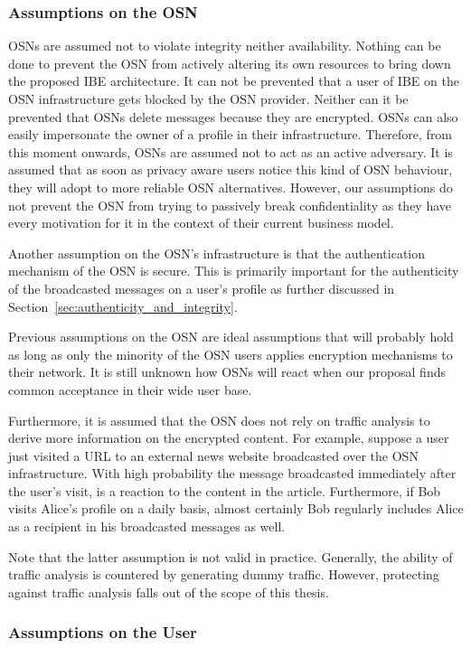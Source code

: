 \subsubsection{Assumptions on the OSN}
OSNs are assumed not to violate integrity neither availability. Nothing can be done to prevent the OSN from actively altering its own resources to bring down the proposed IBE architecture. It can not be prevented that a user of IBE on the OSN infrastructure gets blocked by the OSN provider. Neither can it be prevented that OSNs delete messages because they are encrypted. OSNs can also easily impersonate the owner of a profile in their infrastructure. Therefore, from this moment onwards, OSNs are assumed not to act as an active adversary. It is assumed that as soon as privacy aware users notice this kind of OSN behaviour, they will adopt to more reliable OSN alternatives. However, our assumptions do not prevent the OSN from trying to passively break confidentiality as they have every motivation for it in the context of their current business model.

Another assumption on the OSN's infrastructure is that the authentication mechanism of the OSN is secure. This is primarily important for the authenticity of the broadcasted messages on a user's profile as further discussed in Section~\ref{sec:authenticity_and_integrity}.

Previous assumptions on the OSN are ideal assumptions that will probably hold as long as only the minority of the OSN users applies encryption mechanisms to their network. It is still unknown how OSNs will react when our proposal finds common acceptance in their wide user base.

Furthermore, it is assumed that the OSN does not rely on traffic analysis to derive more information on the encrypted content. For example, suppose a user just visited a URL to an external news website broadcasted over the OSN infrastructure. With high probability the message broadcasted immediately after the user's visit, is a reaction to the content in the article. Furthermore, if Bob visits Alice's profile on a daily basis, almost certainly Bob regularly includes Alice as a recipient in his broadcasted messages as well.

Note that the latter assumption is not valid in practice. Generally, the ability of traffic analysis is countered by generating dummy traffic. However, protecting against traffic analysis falls out of the scope of this thesis.

\subsubsection{Assumptions on the User}

